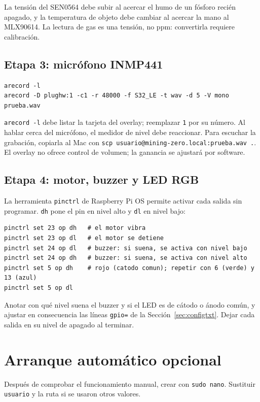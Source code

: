 \documentclass[11pt,a4paper]{article}
\begin{document}
La tensión del SEN0564 debe subir al acercar el humo de un fósforo recién
apagado, y la temperatura de objeto debe cambiar al acercar la mano al
MLX90614. La lectura de gas es una tensión, no ppm: convertirla requiere
calibración.

\subsection*{Etapa 3: micrófono INMP441}

\begin{lstlisting}
arecord -l
arecord -D plughw:1 -c1 -r 48000 -f S32_LE -t wav -d 5 -V mono prueba.wav
\end{lstlisting}

\texttt{arecord -l} debe listar la tarjeta del overlay; reemplazar \texttt{1}
por su número. Al hablar cerca del micrófono, el medidor de nivel debe
reaccionar. Para escuchar la grabación, copiarla al Mac con
\texttt{scp usuario@mining-zero.local:prueba.wav .}. El overlay no ofrece
control de volumen; la ganancia se ajustará por software.\cite{adafruit-i2s}

\subsection*{Etapa 4: motor, buzzer y LED RGB}

La herramienta \texttt{pinctrl} de Raspberry Pi OS permite activar cada salida
sin programar. \texttt{dh} pone el pin en nivel alto y \texttt{dl} en nivel bajo:

\begin{lstlisting}
pinctrl set 23 op dh   # el motor vibra
pinctrl set 23 op dl   # el motor se detiene
pinctrl set 24 op dl   # buzzer: si suena, se activa con nivel bajo
pinctrl set 24 op dh   # buzzer: si suena, se activa con nivel alto
pinctrl set 5 op dh    # rojo (catodo comun); repetir con 6 (verde) y 13 (azul)
pinctrl set 5 op dl
\end{lstlisting}

Anotar con qué nivel suena el buzzer y si el LED es de cátodo o ánodo común, y
ajustar en consecuencia las líneas \texttt{gpio=} de la
Sección~\ref{sec:configtxt}. Dejar cada salida en su nivel de apagado al
terminar.

\section{Arranque automático opcional}

Después de comprobar el funcionamiento manual, crear
 con \texttt{sudo nano}.
Sustituir \texttt{usuario} y la ruta si se usaron otros valores.\cite{systemd}
\end{document}
